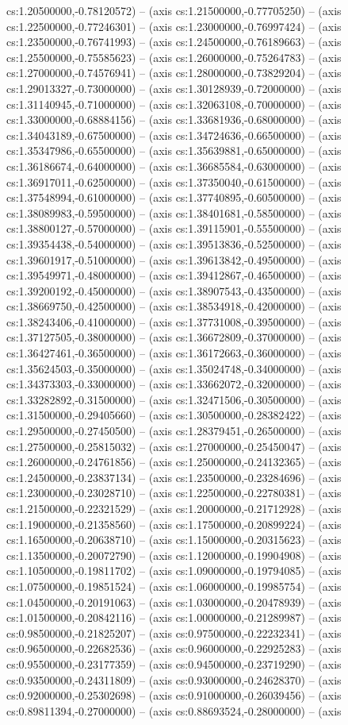 cs:1.20500000,-0.78120572) -- (axis cs:1.21500000,-0.77705250) -- (axis cs:1.22500000,-0.77246301) -- (axis cs:1.23000000,-0.76997424) -- (axis cs:1.23500000,-0.76741993) -- (axis cs:1.24500000,-0.76189663) -- (axis cs:1.25500000,-0.75585623) -- (axis cs:1.26000000,-0.75264783) -- (axis cs:1.27000000,-0.74576941) -- (axis cs:1.28000000,-0.73829204) -- (axis cs:1.29013327,-0.73000000) -- (axis cs:1.30128939,-0.72000000) -- (axis cs:1.31140945,-0.71000000) -- (axis cs:1.32063108,-0.70000000) -- (axis cs:1.33000000,-0.68884156) -- (axis cs:1.33681936,-0.68000000) -- (axis cs:1.34043189,-0.67500000) -- (axis cs:1.34724636,-0.66500000) -- (axis cs:1.35347986,-0.65500000) -- (axis cs:1.35639881,-0.65000000) -- (axis cs:1.36186674,-0.64000000) -- (axis cs:1.36685584,-0.63000000) -- (axis cs:1.36917011,-0.62500000) -- (axis cs:1.37350040,-0.61500000) -- (axis cs:1.37548994,-0.61000000) -- (axis cs:1.37740895,-0.60500000) -- (axis cs:1.38089983,-0.59500000) -- (axis cs:1.38401681,-0.58500000) -- (axis cs:1.38800127,-0.57000000) -- (axis cs:1.39115901,-0.55500000) -- (axis cs:1.39354438,-0.54000000) -- (axis cs:1.39513836,-0.52500000) -- (axis cs:1.39601917,-0.51000000) -- (axis cs:1.39613842,-0.49500000) -- (axis cs:1.39549971,-0.48000000) -- (axis cs:1.39412867,-0.46500000) -- (axis cs:1.39200192,-0.45000000) -- (axis cs:1.38907543,-0.43500000) -- (axis cs:1.38669750,-0.42500000) -- (axis cs:1.38534918,-0.42000000) -- (axis cs:1.38243406,-0.41000000) -- (axis cs:1.37731008,-0.39500000) -- (axis cs:1.37127505,-0.38000000) -- (axis cs:1.36672809,-0.37000000) -- (axis cs:1.36427461,-0.36500000) -- (axis cs:1.36172663,-0.36000000) -- (axis cs:1.35624503,-0.35000000) -- (axis cs:1.35024748,-0.34000000) -- (axis cs:1.34373303,-0.33000000) -- (axis cs:1.33662072,-0.32000000) -- (axis cs:1.33282892,-0.31500000) -- (axis cs:1.32471506,-0.30500000) -- (axis cs:1.31500000,-0.29405660) -- (axis cs:1.30500000,-0.28382422) -- (axis cs:1.29500000,-0.27450500) -- (axis cs:1.28379451,-0.26500000) -- (axis cs:1.27500000,-0.25815032) -- (axis cs:1.27000000,-0.25450047) -- (axis cs:1.26000000,-0.24761856) -- (axis cs:1.25000000,-0.24132365) -- (axis cs:1.24500000,-0.23837134) -- (axis cs:1.23500000,-0.23284696) -- (axis cs:1.23000000,-0.23028710) -- (axis cs:1.22500000,-0.22780381) -- (axis cs:1.21500000,-0.22321529) -- (axis cs:1.20000000,-0.21712928) -- (axis cs:1.19000000,-0.21358560) -- (axis cs:1.17500000,-0.20899224) -- (axis cs:1.16500000,-0.20638710) -- (axis cs:1.15000000,-0.20315623) -- (axis cs:1.13500000,-0.20072790) -- (axis cs:1.12000000,-0.19904908) -- (axis cs:1.10500000,-0.19811702) -- (axis cs:1.09000000,-0.19794085) -- (axis cs:1.07500000,-0.19851524) -- (axis cs:1.06000000,-0.19985754) -- (axis cs:1.04500000,-0.20191063) -- (axis cs:1.03000000,-0.20478939) -- (axis cs:1.01500000,-0.20842116) -- (axis cs:1.00000000,-0.21289987) -- (axis cs:0.98500000,-0.21825207) -- (axis cs:0.97500000,-0.22232341) -- (axis cs:0.96500000,-0.22682536) -- (axis cs:0.96000000,-0.22925283) -- (axis cs:0.95500000,-0.23177359) -- (axis cs:0.94500000,-0.23719290) -- (axis cs:0.93500000,-0.24311809) -- (axis cs:0.93000000,-0.24628370) -- (axis cs:0.92000000,-0.25302698) -- (axis cs:0.91000000,-0.26039456) -- (axis cs:0.89811394,-0.27000000) -- (axis cs:0.88693524,-0.28000000) -- (axis 